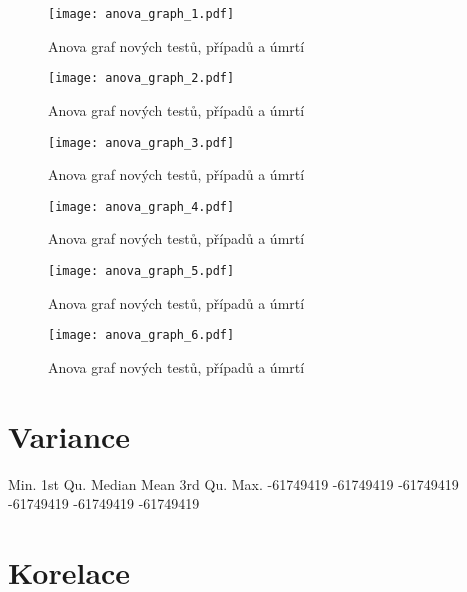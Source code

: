 \documentclass[a4paper, 12pt]{article}
\begin{document}
\begin{figure}[H]
\centering

\texttt{[image: anova\_graph\_1.pdf]}
\caption{Anova graf nových testů, případů a úmrtí}

\end{figure}

\begin{figure}[H]
\centering

\texttt{[image: anova\_graph\_2.pdf]}
\caption{Anova graf nových testů, případů a úmrtí}

\texttt{[image: anova\_graph\_3.pdf]}
\caption{Anova graf nových testů, případů a úmrtí}

\end{figure}

\begin{figure}[H]
\centering

\texttt{[image: anova\_graph\_4.pdf]}
\caption{Anova graf nových testů, případů a úmrtí}

\texttt{[image: anova\_graph\_5.pdf]}
\caption{Anova graf nových testů, případů a úmrtí}

\end{figure}

\begin{figure}[H]
\centering

\texttt{[image: anova\_graph\_6.pdf]}
\caption{Anova graf nových testů, případů a úmrtí}

\end{figure}

\clearpage
\section{Variance}
\begin{Schunk}
\begin{Soutput}
     Min.   1st Qu.    Median      Mean   3rd Qu.      Max. 
-61749419 -61749419 -61749419 -61749419 -61749419 -61749419 
\end{Soutput}
\end{Schunk}

\section{Korelace}
\end{document}
